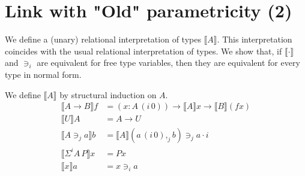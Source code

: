 \documentclass{PaperTools/latex/llncs}
\newcommand\CP[3]{(#2,_{#1} #3)}
\newcommand\param[1]{\!\cdot\!#1}
\newcommand\op[1]{∋_{#1}}
\newcommand\ip[3]{Σ^{#1} {#2}\,{#3}}
\newcommand\mor[2]{{#1}\,{#2}}
\newcommand\proj[2]{\mor{#2}{(#1\,0)}}
\begin{document}
\section{Link with "Old" parametricity (2)}
We define a (unary) relational interpretation of types $⟦A⟧$. This
interpretation coincides with the usual relational interpretation of types.
We show that, if $⟦·⟧$ and $∋_i$ are equivalent for free type variables,
then they are equivalent for every type in normal form.

\begin{definition}
We define $⟦A⟧$ by structural induction on $A$.
  \begin{align*}
    ⟦A → B⟧ f & = (x:\proj i A) → ⟦A⟧ x → ⟦B⟧ (f x)\\
    ⟦U⟧ A & = A → U\\
    ⟦A \op j a ⟧ b &= ⟦A⟧ \CP j {\proj i a} b \op j a \param i \\
    ⟦\ip i A P⟧ x & = P x\\
    ⟦x⟧ a & = x \op i a
  \end{align*}
\end{definition}

\providecommand\TO{\overrightarrow}
\providecommand\FROM{\overleftarrow}
\end{document}
